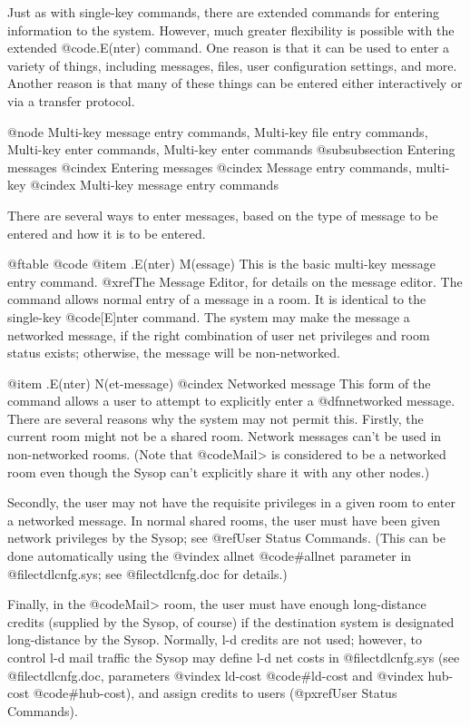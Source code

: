 Just as with single-key commands, there are extended commands for entering
information to the system.  However, much greater flexibility is possible with the
extended @code{.E(nter)} command.  One reason is that it can be used to enter a
variety of things, including messages, files, user configuration settings, and
more.  Another reason is that many of these things can be entered either
interactively or via a transfer protocol.

@node Multi-key message entry commands, Multi-key file entry commands, Multi-key enter commands, Multi-key enter commands
@subsubsection Entering messages
@cindex Entering messages
@cindex Message entry commands, multi-key
@cindex Multi-key message entry commands

There are several ways to enter messages, based on the type of message to be
entered and how it is to be entered.

@ftable @code
@item .E(nter) M(essage)
This is the basic multi-key message entry command.  @xref{The Message Editor},
for details on the message editor.  The command allows
normal entry of a message in a
room.  It is identical to the single-key @code{[E]nter} command.  The system
may make the message a networked message, if the right combination of
user net privileges and room status exists; otherwise, the message will
be non-networked.

@item .E(nter) N(et-message)
@cindex Networked message
This form of the command allows a user to
attempt to explicitly enter a @dfn{networked}
message.  There are several reasons why the system may not permit this.
Firstly, the current room might not be a shared room.  Network
messages can't be used in non-networked rooms.  (Note that @code{Mail>} is
considered to be a networked room even though the Sysop can't
explicitly share it with any other nodes.)

Secondly, the user may not have the requisite privileges in a
given room to enter a networked message.  In normal shared rooms, the
user must have been given network privileges by the Sysop; see
@ref{User Status Commands}.
(This can be done automatically using the
@vindex allnet
@code{#allnet} parameter in
@file{ctdlcnfg.sys}; see @file{ctdlcnfg.doc} for details.)

Finally, in the @code{Mail>} room, the user must have enough long-distance
credits (supplied by the Sysop, of course) if the destination system
is designated long-distance by the Sysop.  Normally, l-d credits are
not used;
however, to control l-d mail traffic the Sysop may define l-d net costs in
@file{ctdlcnfg.sys}
(see @file{ctdlcnfg.doc}, parameters
@vindex ld-cost
@code{#ld-cost} and
@vindex hub-cost
@code{#hub-cost}),
and assign credits to users (@pxref{User Status Commands}).

